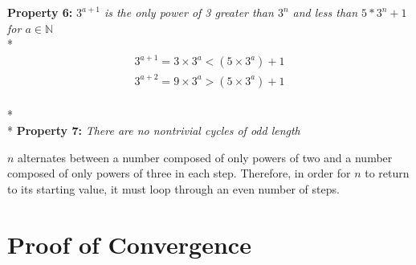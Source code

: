 \documentclass{article}
\begin{document}
\noindent
\large{\textbf{Property 6:}} \textit{${3^{a+1}}$ is the only power of 3 greater than $3^n$ and less than $5*3^n +1$ for $a \in \mathbb{N}$}\\*
\begin{gather*}
     3^{a+1} = 3 \times 3^{a} <( 5 \times 3^{a}) + 1\\
     3^{a+2} = 9 \times 3^{a} >( 5 \times 3^{a}) + 1
\end{gather*}\\*
\\*
\noindent
\large{\textbf{Property 7:}} \textit{There are no nontrivial cycles of odd length}

$n$ alternates between a number composed of only powers of two and a number composed of only powers of three in each step. Therefore, in order for $n$ to return to its starting value, it must loop through an even number of steps.


\section{Proof of Convergence}
\end{document}
